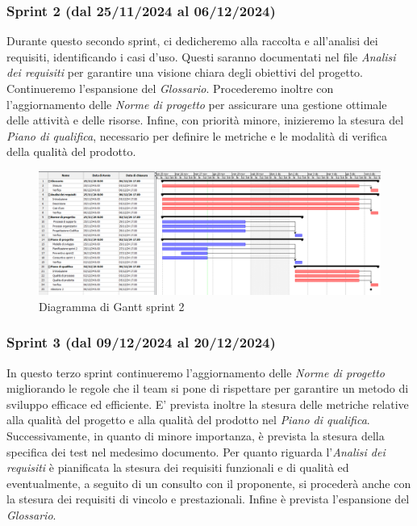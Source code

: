 \subsubsection{Sprint 2 (dal 25/11/2024 al 06/12/2024)}
Durante questo secondo sprint, ci dedicheremo alla raccolta e all'analisi dei
requisiti, identificando i casi d'uso. Questi saranno documentati nel file
\textit{Analisi dei requisiti} per garantire una visione chiara degli obiettivi
del progetto. Continueremo l'espansione del \textit{Glossario}. Procederemo
inoltre con l'aggiornamento delle \textit{Norme di progetto} per assicurare una
gestione ottimale delle attività e delle risorse. Infine, con priorità minore,
inizieremo la stesura del \textit{Piano di qualifica}, necessario per definire
le metriche e le modalità di verifica della qualità del prodotto.

\begin{figure}[h!]
    \centering
    \includegraphics[scale = 0.3]{template/images/gantt2.png}
    \caption{Diagramma di Gantt sprint 2}
    \label{fig:3.2} %
\end{figure}

\subsubsection{Sprint 3 (dal 09/12/2024 al 20/12/2024)}
In questo terzo sprint continueremo l'aggiornamento delle \textit{Norme di
    progetto} migliorando le regole che il team si pone di rispettare per garantire
un metodo di sviluppo efficace ed efficiente. E' prevista inoltre la stesura
delle metriche relative alla qualità del progetto e alla qualità del prodotto
nel \textit{Piano di qualifica}. Successivamente, in quanto di minore
importanza, è prevista la stesura della specifica dei test nel medesimo
documento. Per quanto riguarda l'\textit{Analisi dei requisiti} è pianificata
la stesura dei requisiti funzionali e di qualità ed eventualmente, a seguito di
un consulto con il proponente, si procederà anche con la stesura dei requisiti
di vincolo e prestazionali. Infine è prevista l'espansione del
\textit{Glossario}.

